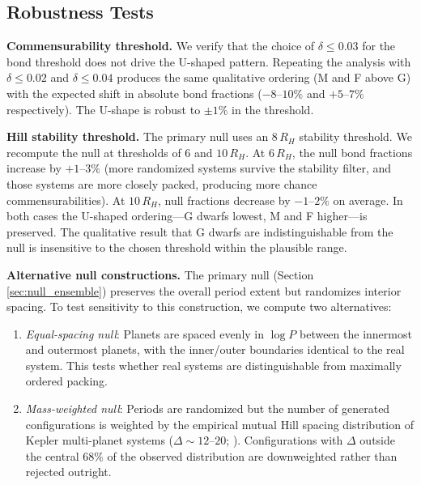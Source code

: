 \documentclass[twocolumn,usenatbib]{mnras}
\begin{document}
\subsection{Robustness Tests}
\label{sec:robustness}

\textbf{Commensurability threshold.} We verify that the choice of $\delta
\leq 0.03$ for the bond threshold does not drive the U-shaped pattern.
Repeating the analysis with $\delta \leq 0.02$ and $\delta \leq 0.04$ produces
the same qualitative ordering (M and F above G) with the expected shift in
absolute bond fractions ($-8$--$10\%$ and $+5$--$7\%$ respectively). The U-shape
is robust to $\pm 1\%$ in the threshold.

\textbf{Hill stability threshold.} \label{sec:hill_threshold_robustness}
The primary null uses an $8\,R_H$ stability threshold. We recompute the null
at thresholds of 6 and $10\,R_H$. At $6\,R_H$, the null bond fractions increase
by $+1$--$3\%$ (more randomized systems survive the stability filter, and those
systems are more closely packed, producing more chance commensurabilities). At
$10\,R_H$, null fractions decrease by $-1$--$2\%$ on average. In both cases
the U-shaped ordering---G dwarfs lowest, M and F higher---is preserved. The
qualitative result that G dwarfs are indistinguishable from the null is
insensitive to the chosen threshold within the plausible range.

\textbf{Alternative null constructions.} \label{sec:null_robustness}
The primary null (Section \ref{sec:null_ensemble}) preserves the overall
period extent but randomizes interior spacing. To test sensitivity to this
construction, we compute two alternatives:

\begin{enumerate}
  \item \textit{Equal-spacing null}: Planets are spaced evenly in $\log P$
        between the innermost and outermost planets, with the inner/outer
        boundaries identical to the real system. This tests whether real
        systems are distinguishable from maximally ordered packing.
  \item \textit{Mass-weighted null}: Periods are randomized but the number of
        generated configurations is weighted by the empirical mutual Hill
        spacing distribution of Kepler multi-planet systems ($\Delta \sim
        12$--$20$; \citet{puwu2015}). Configurations with $\Delta$ outside
        the central 68\% of the observed distribution are downweighted rather
        than rejected outright.
\end{enumerate}
\end{document}
